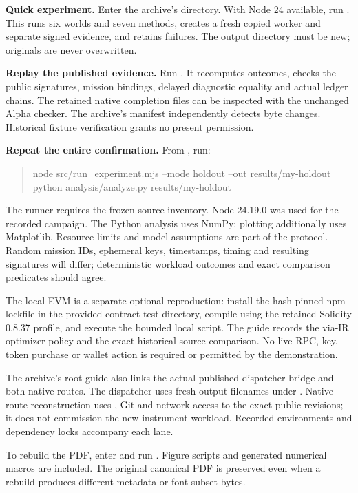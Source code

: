 \textbf{Quick experiment.} Enter the archive's  directory. With Node 24 available, run . This runs six worlds and seven methods, creates a fresh copied worker and separate signed evidence, and retains failures. The output directory must be new; originals are never overwritten.

\textbf{Replay the published evidence.} Run . It recomputes outcomes, checks the public signatures, mission bindings, delayed diagnostic equality and actual ledger chains. The retained native completion files can be inspected with the unchanged Alpha checker. The archive's manifest independently detects byte changes. Historical fixture verification grants no present permission.

\textbf{Repeat the entire confirmation.} From , run:
\begin{quote}\small\ttfamily
node src/run\_experiment.mjs --mode holdout --out results/my-holdout\\
python analysis/analyze.py results/my-holdout
\end{quote}
The runner requires the frozen source inventory. Node 24.19.0 was used for the recorded campaign. The Python analysis uses NumPy; plotting additionally uses Matplotlib. Resource limits and model assumptions are part of the protocol. Random mission IDs, ephemeral keys, timestamps, timing and resulting signatures will differ; deterministic workload outcomes and exact comparison predicates should agree.

The local EVM is a separate optional reproduction: install the hash-pinned npm lockfile in the provided contract test directory, compile using the retained Solidity 0.8.37 profile, and execute the bounded local script. The guide records the via-IR optimizer policy and the exact historical source comparison. No live RPC, key, token purchase or wallet action is required or permitted by the demonstration.

The archive's root guide also links the actual published dispatcher bridge and both native routes. The dispatcher uses fresh output filenames under . Native route reconstruction uses , Git and network access to the exact public revisions; it does not commission the new instrument workload. Recorded environments and dependency locks accompany each lane.

To rebuild the PDF, enter  and run . Figure scripts and generated numerical macros are included. The original canonical PDF is preserved even when a rebuild produces different metadata or font-subset bytes.

